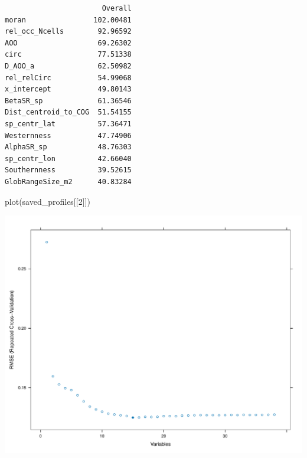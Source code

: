 \documentclass[
  letterpaper,
  DIV=11,
  numbers=noendperiod]{scrreprt}
\newenvironment{Shaded}{\begin{snugshade}}{\end{snugshade}}
\newcommand{\DecValTok}[1]{\textcolor[rgb]{0.68,0.00,0.00}{#1}}
\newcommand{\FunctionTok}[1]{\textcolor[rgb]{0.28,0.35,0.67}{#1}}
\newcommand{\NormalTok}[1]{\textcolor[rgb]{0.00,0.23,0.31}{#1}}
\newcommand{\SpecialCharTok}[1]{\textcolor[rgb]{0.37,0.37,0.37}{#1}}
\begin{document}
\begin{Shaded}
\end{Shaded}

\begin{verbatim}
                       Overall
moran                102.00481
rel_occ_Ncells        92.96592
AOO                   69.26302
circ                  77.51338
D_AOO_a               62.50982
rel_relCirc           54.99068
x_intercept           49.80143
BetaSR_sp             61.36546
Dist_centroid_to_COG  51.54155
sp_centr_lat          57.36471
Westernness           47.74906
AlphaSR_sp            48.76303
sp_centr_lon          42.66040
Southernness          39.52615
GlobRangeSize_m2      40.83284
\end{verbatim}

\begin{Shaded}
\begin{Highlighting}[]
\FunctionTok{plot}\NormalTok{(saved\_profiles[[}\DecValTok{2}\NormalTok{]])}
\end{Highlighting}
\end{Shaded}

\includegraphics{02_rfe_files/figure-pdf/rfe-results-boxplot-j-2.pdf}
\end{document}
